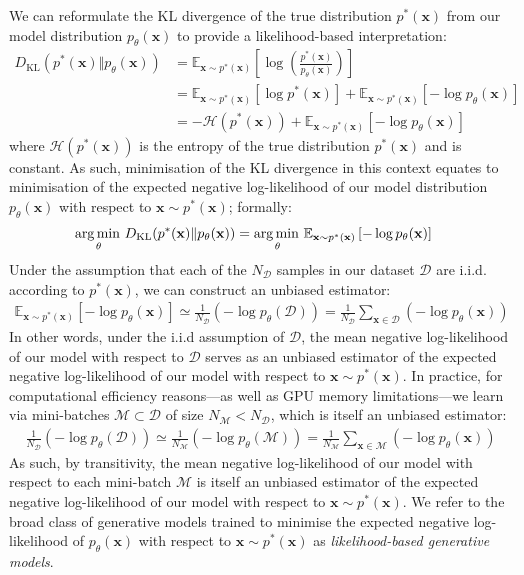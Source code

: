 \documentclass[ oneside,%
                    author={George Herbert},
                    degree={MSci},
                     title={Video Diffusion Models for Climate Simulations},
                  subtitle={}]{dissertation}
\begin{document}
We can reformulate the KL divergence of the true distribution $p^*(\mathbf{x})$ from our model distribution $p_\theta(\mathbf{x})$ to provide a likelihood-based interpretation:
\begin{align}
      D_{\mathrm{KL}}(p^*(\mathbf{x})\Vert p_\theta(\mathbf{x}))&=\mathbb{E}_{\mathbf{x}\sim p^*(\mathbf{x})}\left[\log\left(\frac{p^*(\mathbf{x})}{p_\theta(\mathbf{x})}\right)\right]\\
      &=\mathbb{E}_{\mathbf{x}\sim p^*(\mathbf{x})}\left[\log p^*(\mathbf{x})\right]+\mathbb{E}_{\mathbf{x}\sim p^*(\mathbf{x})}\left[-\log p_\theta(\mathbf{x})\right]\\
      &=-\mathcal{H}(p^*(\mathbf{x}))+\mathbb{E}_{\mathbf{x}\sim p^*(\mathbf{x})}\left[-\log p_\theta(\mathbf{x})\right]
\end{align}
where $\mathcal{H}{(p^*(\mathbf{x}))}$ is the entropy of the true distribution $p^*(\mathbf{x})$ and is constant. As such, minimisation of the KL divergence in this context equates to minimisation of the expected negative log-likelihood of our model distribution $p_\theta(\mathbf{x})$ with respect to $\mathbf{x}\sim p^*(\mathbf{x})$; formally:
\begin{align}
      \operatorname*{arg\,min\,}_\theta D_{\mathrm{KL}}(p^*(\mathbf{x})\Vert p_\theta(\mathbf{x}))&=\operatorname*{arg\,min\,}_\theta \mathbb{E}_{\mathbf{x}\sim p^*(\mathbf{x})}\left[-\log p_\theta(\mathbf{x})\right]
\end{align}
Under the assumption that each of the $N_\mathcal{D}$ samples in our dataset $\mathcal{D}$ are i.i.d. according to $p^*(\mathbf{x})$, we can construct an unbiased estimator:
\begin{align}
      \mathbb{E}_{\mathbf{x}\sim p^*(\mathbf{x})}\left[-\log p_\theta(\mathbf{x})\right]\simeq \frac{1}{N_{\mathcal{D}}}\left(-\log p_\theta(\mathcal{D})\right) = \frac{1}{N_{\mathcal{D}}} \sum_{\mathbf{x}\in\mathcal{D}} \left(-\log p_\theta(\mathbf{x})\right)
\end{align}
In other words, under the i.i.d assumption of $\mathcal{D}$, the mean negative log-likelihood of our model with respect to $\mathcal{D}$ serves as an unbiased estimator of the expected negative log-likelihood of our model with respect to $\mathbf{x}\sim p^*(\mathbf{x})$. In practice, for computational efficiency reasons---as well as GPU memory limitations---we learn via mini-batches $\mathcal{M}\subset \mathcal{D}$ of size $N_\mathcal{M} < N_\mathcal{D}$, which is itself an unbiased estimator:
\begin{align}
      \frac{1}{N_\mathcal{D}}\left(-\log p_\theta(\mathcal{D})\right)\simeq \frac{1}{N_\mathcal{M}}\left(-\log p_\theta(\mathcal{M})\right)=\frac{1}{N_\mathcal{M}}\sum_{\mathbf{x}\in\mathcal{M}}\left(-\log p_\theta(\mathbf{x})\right)
\end{align}
As such, by transitivity, the mean negative log-likelihood of our model with respect to each mini-batch $\mathcal{M}$ is itself an unbiased estimator of the expected negative log-likelihood of our model with respect to $\mathbf{x}\sim p^*(\mathbf{x})$. We refer to the broad class of generative models trained to minimise the expected negative log-likelihood of $p_\theta(\mathbf{x})$ with respect to $\mathbf{x}\sim p^*(\mathbf{x})$ as \textit{likelihood-based generative models}.
\end{document}
